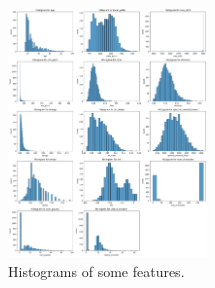 \begin{figure}
    \includegraphics[width = 0.47\textwidth]{img/distribuzioni_features.png}
    \caption{Histograms of some features.}
    \label{hist_distributivi}
\end{figure}